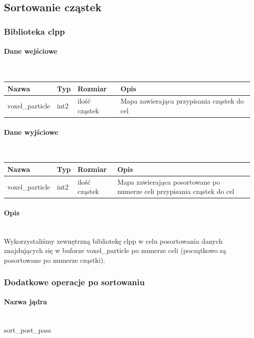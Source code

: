 \documentclass[polish, 12pt]{aghthesis}
\begin{document}
		\subsection{Sortowanie cząstek}
			\subsubsection{Biblioteka clpp}
			\paragraph{Dane wejściowe} \ \\
				\begin{tabular}{| p{} | p{} | p{} | p{} |}
				\hline
					Nazwa & Typ & Rozmiar & Opis \\
				\hline
					voxel\_particle & int2 & ilość cząstek & Mapa zawierająca przypisania cząstek do cel \\ 
				\hline
				\end{tabular}
			\paragraph{Dane wyjściowe} \ \\
				\begin{tabular}{| p{} | p{} | p{} | p{} |}
				\hline
					Nazwa & Typ & Rozmiar & Opis \\
				\hline
					voxel\_particle & int2 & ilość cząstek & Mapa zawierająca posortowane po numerze celi przypisania cząstek do cel\\ 
				\hline
				\end{tabular}
			\paragraph{Opis} \ \\
				\indent Wykorzystaliśmy zewnętrzną bibliotekę clpp w celu posortowania danych znajdujących się w buforze voxel\_particle po numerze celi (początkowo są posortowane po numerze cząstki).
			\subsubsection{Dodatkowe operacje po sortowaniu}
				\paragraph{Nazwa jądra} \ \\
					sort\_post\_pass
\end{document}
